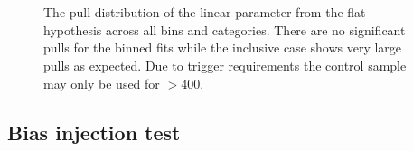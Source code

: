 \begin{figure}[h!]
  \centering
  ~~
  \\
  ~~
  \\
  \caption{\label{fig:frenchFlagPulls} The pull distribution of the linear parameter from the flat hypothesis across all
  \scalht bins and categories. There are no significant pulls for the \scalht binned
  fits while the \scalht inclusive case shows very large pulls as expected. 
  Due to trigger requirements the \gj control sample may only be used for \scalht $> 400$\GeV.}
\end{figure}
\subsection{Bias injection test}

